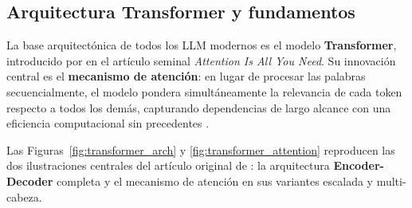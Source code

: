\subsection{Arquitectura Transformer y fundamentos}

La base arquitectónica de todos los LLM modernos es el modelo \textbf{Transformer}, introducido por \citet{vaswani2017attention} en el artículo seminal \textit{Attention Is All You Need}. Su innovación central es el \textbf{mecanismo de atención}: en lugar de procesar las palabras secuencialmente, el modelo pondera simultáneamente la relevancia de cada token respecto a todos los demás, capturando dependencias de largo alcance con una eficiencia computacional sin precedentes \citep{vaswani2017attention, garcia2025desarrollo}.

Las Figuras~\ref{fig:transformer_arch} y \ref{fig:transformer_attention} reproducen las dos ilustraciones centrales del artículo original de \citet{vaswani2017attention}: la arquitectura \textbf{Encoder-Decoder} completa y el mecanismo de atención en sus variantes escalada y multi-cabeza.

